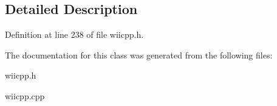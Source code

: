 \subsection{Detailed Description}


Definition at line 238 of file wiicpp.\-h.



The documentation for this class was generated from the following files\-:\begin{DoxyCompactItemize}
\item 
wiicpp.\-h\item 
wiicpp.\-cpp\end{DoxyCompactItemize}
